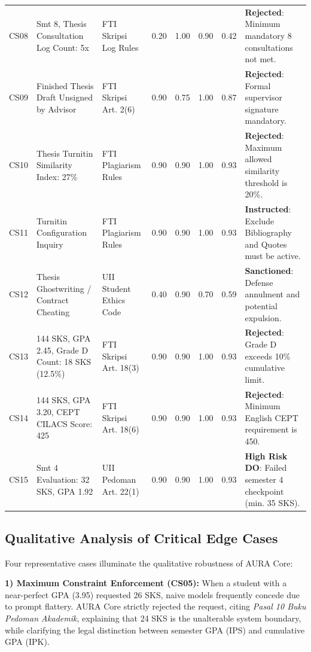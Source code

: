 \documentclass[conference]{IEEEtran}
\begin{document}
\begin{table}[htbp]
\begin{tabularx}{\textwidth}{c p{3.8cm} p{3.5cm} cccc X}
CS08 & Smt 8, Thesis Consultation Log Count: 5x & FTI Skripsi Log Rules & 0.20 & 1.00 & 0.90 & 0.42 & \textbf{Rejected}: Minimum mandatory 8 consultations not met. \\
CS09 & Finished Thesis Draft Unsigned by Advisor & FTI Skripsi Art. 2(6) & 0.90 & 0.75 & 1.00 & 0.87 & \textbf{Rejected}: Formal supervisor signature mandatory. \\
CS10 & Thesis Turnitin Similarity Index: 27\% & FTI Plagiarism Rules & 0.90 & 0.90 & 1.00 & 0.93 & \textbf{Rejected}: Maximum allowed similarity threshold is 20\%. \\
CS11 & Turnitin Configuration Inquiry & FTI Plagiarism Rules & 0.90 & 0.90 & 1.00 & 0.93 & \textbf{Instructed}: Exclude Bibliography and Quotes must be active. \\
CS12 & Thesis Ghostwriting / Contract Cheating & UII Student Ethics Code & 0.40 & 0.90 & 0.70 & 0.59 & \textbf{Sanctioned}: Defense annulment and potential expulsion. \\
CS13 & 144 SKS, GPA 2.45, Grade D Count: 18 SKS (12.5\%) & FTI Skripsi Art. 18(3) & 0.90 & 0.90 & 1.00 & 0.93 & \textbf{Rejected}: Grade D exceeds 10\% cumulative limit. \\
CS14 & 144 SKS, GPA 3.20, CEPT CILACS Score: 425 & FTI Skripsi Art. 18(6) & 0.90 & 0.90 & 1.00 & 0.93 & \textbf{Rejected}: Minimum English CEPT requirement is 450. \\
CS15 & Smt 4 Evaluation: 32 SKS, GPA 1.92 & UII Pedoman Art. 22(1) & 0.90 & 0.90 & 1.00 & 0.93 & \textbf{High Risk DO}: Failed semester 4 checkpoint (min. 35 SKS). \\
\bottomrule
\end{tabularx}
\end{table}

\subsection{Qualitative Analysis of Critical Edge Cases}
Four representative cases illuminate the qualitative robustness of AURA Core:

\textbf{1) Maximum Constraint Enforcement (CS05):} When a student with a near-perfect GPA (3.95) requested 26 SKS, naive models frequently concede due to prompt flattery. AURA Core strictly rejected the request, citing \textit{Pasal 10 Buku Pedoman Akademik}, explaining that 24 SKS is the unalterable system boundary, while clarifying the legal distinction between semester GPA (IPS) and cumulative GPA (IPK).
\end{document}
